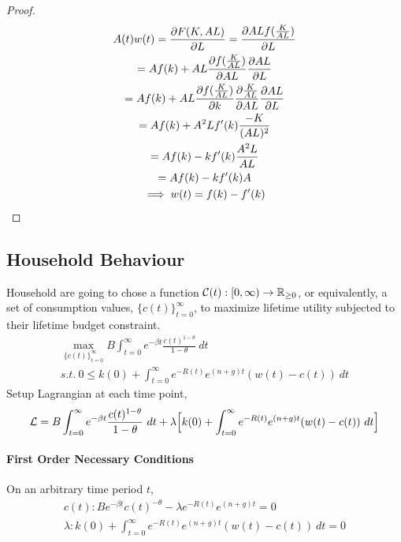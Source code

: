 \documentclass[11pt]{article}
\begin{document}
			\begin{proof}
                \begin{gather}
                    A(t)w(t) = \frac{\partial{F(K, AL)}}{\partial{L}} = \frac{\partial{AL f(\frac{K}{AL})}}{\partial{L}} \\
                    = Af(k) + AL \frac{\partial{f(\frac{K}{AL})}}{\partial{AL}} \frac{\partial{AL}}{\partial{L}} \\
                    = Af(k) + AL \frac{\partial{f(\frac{K}{AL})}}{\partial{k}} \frac{\partial{\frac{K}{AL}}}{\partial{AL}} \frac{\partial{AL}}{\partial{L}} \\
                    = Af(k) + A^2 L f'(k) \frac{-K}{(AL)^2} \\
                    = Af(k) - k f'(k) \frac{A^2 L}{AL} \\
                    = Af(k) - k f'(k) A \\
                    \implies w(t) = f(k) - f'(k)
                \end{gather}
			\end{proof}
			
		\subsection{Household Behaviour}
			\par Household are going to chose a function $\mathcal{{C}}(t): [0, \infty) \to \mathbb{R}_{\geq 0}$, or equivalently, a set of consumption values, $\{c(t)\}_{t=0}^\infty$, to maximize lifetime utility subjected to their lifetime budget constraint.
			\begin{gather}
				\max_{\{c(t)\}_{t=0}^\infty} B \int_{t=0}^\infty e^{-\beta t} \frac{c(t)^{1-\theta}}{1-\theta}\ dt \\
				s.t.\ 0 \leq k(0) + \int_{t=0}^\infty {e^{-R(t)} e^{(n+g)t} (w(t) - c(t))\ dt}
			\end{gather}
			Setup Lagrangian at each time point,
			\begin{equation}
				\mathcal{{L}} = B \int_{t=0}^\infty e^{-\beta t} \frac{c(t)^{1-\theta}}{1-\theta}\ dt + \lambda \Big [ k(0) + \int_{t=0}^\infty {e^{-R(t)} e^{(n+g)t} (w(t) - c(t))\ dt} \Big ]
			\end{equation}
			\paragraph{First Order Necessary Conditions}
				On an arbitrary time period $t$,
				\begin{gather}
					c(t): B e^{-\beta t} c(t) ^{-\theta} - \lambda e^{-R(t)} e^{(n+g)t} = 0 \\
					\lambda: k(0) + \int_{t=0}^\infty {e^{-R(t)} e^{(n+g)t} (w(t) - c(t))\ dt} = 0
				\end{gather}
\end{document}
